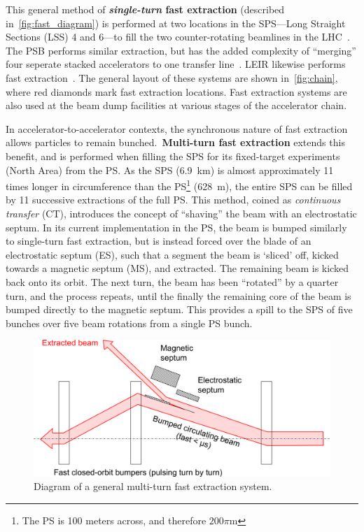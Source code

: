 \documentclass[11pt]{report}
\begin{document}
This general method of \textbf{\textit{single-turn} fast extraction} (described in~\autoref{fig:fast_diagram}) is performed at two locations in the SPS---Long Straight Sections (LSS) 4 and 6---to fill the two counter-rotating beamlines in the LHC~\cite{Fraser:CAS}. The PSB performs similar extraction, but has the added complexity of ``merging'' four seperate stacked accelerators to one transfer line~\cite{Metzmacher:2061508}. LEIR likewise performs fast extraction~\cite{Ghithan:2017wpd}. The general layout of these systems are shown in~\ref{fig:chain}, where red diamonds mark fast extraction locations. Fast extraction systems are also used at the beam dump facilities at various stages of the accelerator chain.

In accelerator-to-accelerator contexts, the synchronous nature of fast extraction allows particles to remain bunched.~\textbf{Multi-turn fast extraction} extends this benefit, and is performed when filling the SPS for its fixed-target experiments (North Area) from the PS. As the SPS (\qty{6.9}{km}) is almost approximately 11 times longer in circumference than the PS\footnote{The PS is 100 meters across, and therefore $200\pi$\si{m}} (\qty{628}{m}), the entire SPS can be filled by 11 successive extractions of the full PS. This method, coined as \textit{continuous transfer} (CT), introduces the concept of ``shaving'' the beam with an electrostatic septum. In its current implementation in the PS, the beam is bumped similarly to single-turn fast extraction, but is instead forced over the blade of an electrostatic septum (ES), such that a segment the beam is `sliced' off, kicked towards a magnetic septum (MS), and extracted. The remaining beam is kicked back onto its orbit. The next turn, the beam has been ``rotated'' by a quarter turn, and the process repeats, until the finally the remaining core of the beam is bumped directly to the magnetic septum. This provides a spill to the SPS of five bunches over five beam rotations from a single PS bunch.

\begin{figure}[hb]
  \centering
  \includegraphics[width=\linewidth]{fastmulti.png}
  \caption{Diagram of a general multi-turn fast extraction system.~\cite{Fraser:CAS}}
  \label{fig:fast_multi_diagram}
\end{figure}
\end{document}
